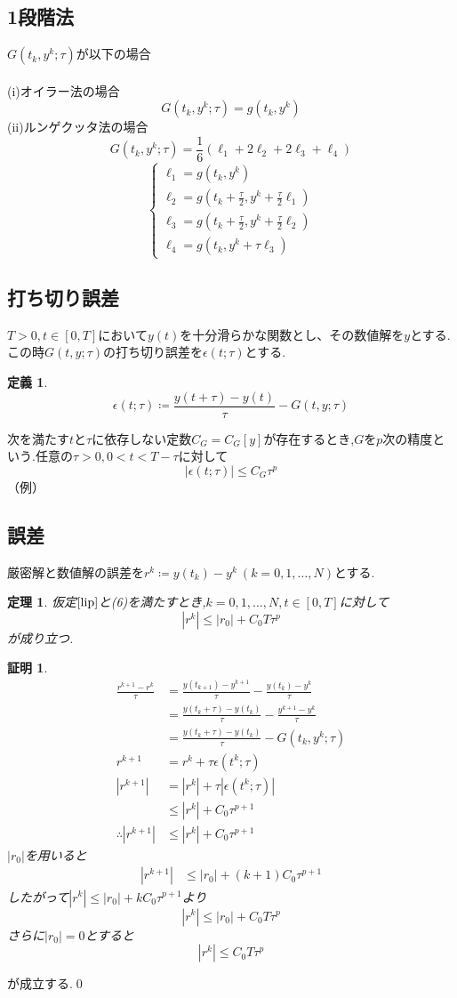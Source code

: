 \documentclass[a4,12pt]{article}
\newtheorem{thm}{定理}
\newtheorem{dfn}{定義}
\newtheorem{prf}{証明}
\begin{document}
\subsection{1段階法}
$G(t_k,y^k;\tau)$が以下の場合\\
\\(i)オイラー法の場合
\[G(t_k,y^k;\tau)=g(t_k,y^k)\]
(ii)ルンゲクッタ法の場合
\[G(t_k,y^k;\tau)=\frac{1}{6}(\ell_1+2\ell_2+2\ell_3+\ell_4)\]
\[\begin{cases}
\ell_1=g(t_k,y^k)\\
\ell_2=g(t_k+\displaystyle\frac{\tau}{2},y^k+\frac{\tau}{2}\ell_1)\\
\ell_3=g(t_k+\displaystyle\frac{\tau}{2},y^k+\frac{\tau}{2}\ell_2)\\ 
\ell_4=g(t_k,y^k+\tau \ell_3)
\end{cases}\]
\subsection{打ち切り誤差}
$T>0,t\in[0,T]$において$y(t)$を十分滑らかな関数とし、その数値解を$y$とする.この時$G(t,y;\tau)$の打ち切り誤差を$\epsilon(t;\tau)$とする.
\begin{dfn}\[\epsilon(t;\tau)\coloneqq\frac{y(t+\tau)-y(t)}{\tau}-G(t,y;\tau)\]\end{dfn}
次を満たす$t$と$\tau$に依存しない定数$C_G=C_G[y]$が存在するとき,$G$を$p$次の精度という.任意の$\tau>0,0<t<T-\tau$に対して
\begin{equation}
|\epsilon(t;\tau)|\leq C_G\tau^p
\end{equation}
（例）
\subsection{誤差}
厳密解と数値解の誤差を$r^k\coloneqq y(t_k)-y^k\ (k=0,1,\ldots,N)$とする.
\begin{thm}\label{th1}仮定$\ref{lip}$と(6)を満たすとき,$k=0,1,\ldots ,N,t\in[0,T]$に対して
\[|r^{k}|\leq |r_0|+C_0T\tau^{p}\]
が成り立つ.
\end{thm}
\begin{prf}
\[\begin{split}
\frac{r^{k+1}-r^k}{\tau}&=\frac{y(t_{k+1})-y^{k+1}}{\tau}- \frac{y(t_k)-y^k}{\tau}\\
&=\frac{y(t_k+\tau)-y(t_k)}{\tau}- \frac{y^{k+1}-y^k}{\tau}\\
&=\frac{y(t_k+\tau)-y(t_k)}{\tau}-G(t_k,y^k;\tau)\\
r^{k+1}&=r^k+\tau\epsilon(t^k;\tau)\\
|r^{k+1}|&=|r^k|+\tau |\epsilon(t^k;\tau)|\\
&\leq |r^k|+C_0\tau^{p+1}\\
\therefore |r^{k+1}|&\leq |r^k|+C_0\tau^{p+1}
\end{split}\]
$|r_0|$を用いると
\[\begin{split}
|r^{k+1}|&\leq |r_0|+(k+1)C_0\tau^{p+1}
\end{split}\]
したがって$|r^{k}|\leq |r_0|+kC_0\tau^{p+1}$より
\[|r^{k}|\leq |r_0|+C_0T\tau^{p}\]
さらに$|r_0|=0$とすると
\[|r^{k}|\leq C_0T\tau^{p}\]
\end{prf}
が成立する.\qed
\end{document}
